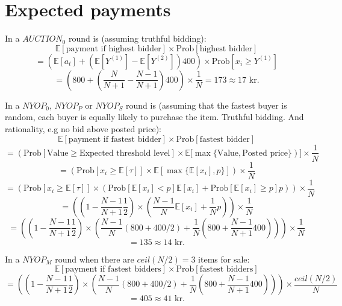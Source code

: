 \documentclass[a4paper,12pt]{article}
\begin{document}
	\section{Expected payments}
	\label{app:expected_payment}
	
	In a $AUCTION_0$ round is (assuming truthful bidding):
	\[ \mathbb{E}[\mbox{payment if highest bidder}] \times \mbox{Prob}[\mbox{highest bidder}] \] 
	\[  = \left( \mathbb{E}[a_t] + (\mathbb{E}[Y^{(1)}]-\mathbb{E}[Y^{(2)}]) 400 \right) \times \mbox{Prob}[x_i \ge Y^{(1)}] \] 
	\[	= \left( 800 + \left(\frac{N}{N+1} - \frac{N-1}{N+1}\right)400 \right) \times \frac{1}{N} = 173 \approx 17\mbox{ kr.} \]
	
	In a $NYOP_0$, $NYOP_P$ or $NYOP_S$ round is (assuming that the fastest buyer is random, each buyer is equally likely to purchase the item. Truthful bidding. And rationality, e.g no bid above posted price):
	\[ \mathbb{E}[\mbox{payment if fastest bidder}] \times \mbox{Prob}[\mbox{fastest bidder}] \] 
	\[  = \left( \mbox{Prob}[\mbox{Value} \ge \mbox{Expected threshold level}] \times \mathbb{E}[\max\{\mbox{Value}, \mbox{Posted price}\} \right)] \times \frac{1}{N} \] 
	\[  = \left( \mbox{Prob}[x_i \ge \mathbb{E}[\tau]] \times \mathbb{E}[\max\{\mathbb{E}[x_i], p\}]  \right) \times \frac{1}{N} \] 
	\[  = \left( \mbox{Prob}[x_i \ge \mathbb{E}[\tau]] \times ( \mbox{Prob}[\mathbb{E}[x_i] < p] \mathbb{E}[x_i] + \mbox{Prob}[\mathbb{E}[x_i] \ge p] p ) \right) \times \frac{1}{N} \] 
	\[  = \left( \left(1-\frac{N-1}{N+1}\frac{1}{2}\right) \times \left( \frac{N-1}{N} \mathbb{E}[x_i] + \frac{1}{N} p \right) \right) \times \frac{1}{N} \] 
	\[  = \left( \left(1-\frac{N-1}{N+1}\frac{1}{2}\right) \times \left( \frac{N-1}{N} (800+400/2) + \frac{1}{N} \left(800+\frac{N-1}{N+1}400\right) \right) \right) \times \frac{1}{N} \] 
	\[	= 135 \approx 14\mbox{ kr.} \]
	
	In a $NYOP_M$ round when there are $ceil(N/2)=3$ items for sale:
	\[ \mathbb{E}[\mbox{payment if fastest bidders}] \times \mbox{Prob}[\mbox{fastest bidders}] \] 
	\[  = \left( \left(1-\frac{N-1}{N+1}\frac{1}{2}\right) \times \left( \frac{N-1}{N} (800+400/2) + \frac{1}{N} \left(800+\frac{N-1}{N+1}400\right) \right) \right) \times \frac{ceil(N/2)}{N} \] 
	\[	= 405 \approx 41\mbox{ kr.} \]
	
	
	\newpage
	\tableofcontents
\end{document}
